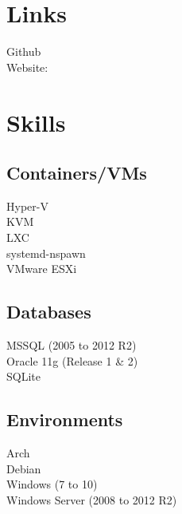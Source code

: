 \documentclass[]{formatting}
\begin{document}
%
%


%
%

\begin{minipage}[t]{0.33\textwidth}


\section{Links}
Github \href{https://github.com/enckse}{} \\
Website:  \href{https://enck.network}{} \\
\sectionsep


\section{Skills}

\subsection{Containers/VMs}
\textbullet{} Hyper-V \\
\textbullet{} KVM \\
\textbullet{} LXC \\
\textbullet{} systemd-nspawn \\
\textbullet{} VMware ESXi
\sectionsep

\subsection{Databases}
\textbullet{} MSSQL (2005 to 2012 R2) \\
\textbullet{} Oracle 11g (Release 1 \& 2) \\
\textbullet{} SQLite
\sectionsep

\subsection{Environments}
\textbullet{} Arch \\ 
\textbullet{} Debian \\
\textbullet{} Windows (7 to 10) \\
\textbullet{} Windows Server (2008 to 2012 R2)
\sectionsep


\end{minipage}
\end{document}
